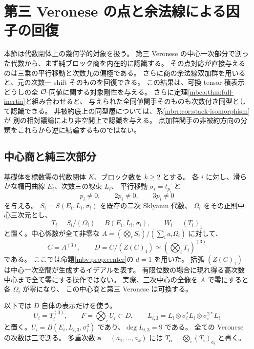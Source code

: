 \section{第三 Veronese の点と余法線による因子の回復}
\label{mbiq:sec:quotients}

本節は代数閉体上の幾何学的対象を扱う。
第三 Veronese の中心一次部分で割った代数から、まず純ブロック商を内在的に認識する。
その点対応が直接与えるのは三乗の平行移動と次数九の偏極である。
さらに商の余法線双加群を用いると、元の次数一 shift そのものを回復できる。
この結果は、可換 tensor 積表示どうしの全 $\mathcal O$-同値に関する対象剛性を与える。
さらに定理\ref{mbca:thm:full-inertia}と組み合わせると、
与えられた全同値関手そのものも次数付き同型として認識できる。
非被約底上の同型層については、系\ref{mbrr:cor:stack-isomorphism}が
別の相対議論により非空開上で認識を与える。
点加群関手の非被約方向の分類をこれらから逆に結論するものではない。

\subsection{中心商と純三次部分}

基礎体を標数零の代数閉体 $K$、ブロック数を $k\geq2$ とする。
各 $i$ に対し、滑らかな楕円曲線 $E_i$、次数三の線束 $L_i$、
平行移動 $\sigma_i=t_{p_i}$ と
\begin{equation}\label{mbiq:eq:order}
 p_i\ne0,\qquad 2p_i\ne0,\qquad 3p_i\ne0
\end{equation}
を与える。
$S_i=S(E_i,L_i,\sigma_i)$ を既存の二次 Sklyanin 代数、
$\Omega_i$ をその正則中心三次元とし、
\[
 T_i=S_i/(\Omega_i)=B(E_i,L_i,\sigma_i),\qquad W_i=(T_i)_1
\]
と置く。中心係数が全て非零な
$A=(\bigotimes_iS_i)/(\sum_i a_i\Omega_i)$ に対して、
\begin{equation}\label{mbiq:eq:central-quotient}
 C=A^{(3)},\qquad
 D=C/(Z(C)_1)\simeq
       \left(\bigotimes_iT_i\right)^{(3)}
\end{equation}
である。
ここでは命題\ref{mbv:prop:center}の $d=1$ を用いた。
括弧 $(Z(C)_1)$ は中心一次空間が生成するイデアルを表す。
有限位数の場合に現れ得る高次数中心まで全て零にする操作ではない。
実際、三次中心の全像を $A$ で零にすると各 $\Omega_i$ が零になり、
この中心商と第三 Veronese は可換する。

以下では $D$ 自体の表示だけを使う。
\[
 U_i=T_i^{(3)},\qquad
 F=\bigotimes_iU_i\subset D,
 \qquad L_{i,3}=L_i\otimes\sigma_i^*L_i\otimes\sigma_i^{2*}L_i
\]
と置く。$U_i=B(E_i,L_{i,3},\sigma_i^3)$ であり、$\deg L_{i,3}=9$ である。
全ての Veronese の次数は三で割る。
多重次数 $\boldsymbol a=(a_1,\ldots,a_k)$ には
$T_{\boldsymbol a}=\bigotimes_i(T_i)_{a_i}$ と書く。

